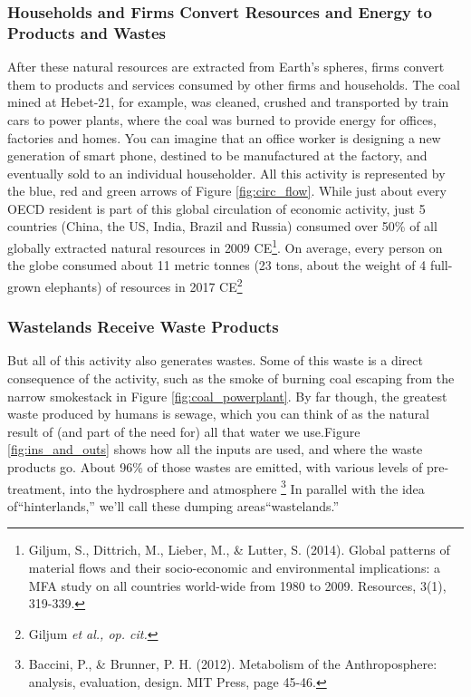 \documentclass[amstex,12pt]{book}
\begin{document}
\subsubsection{Households and Firms Convert Resources and Energy to Products and Wastes}
After these natural resources are extracted from Earth's spheres, firms convert them to products and services consumed by other firms and households. The coal mined at Hebet-21, for example, was cleaned, crushed and transported by train cars to power plants, where the coal was burned to provide energy for offices, factories and homes. You can imagine that an office worker is designing a new generation of smart phone, destined to be manufactured at the factory, and eventually sold to an individual householder. All this activity is represented by the blue, red and green arrows of Figure \ref{fig:circ_flow}. While just about every OECD resident is part of this global circulation of economic activity, just 5 countries (China, the US, India, Brazil and Russia) consumed over 50\% of all globally extracted natural resources in 2009 CE\footnote{Giljum, S., Dittrich, M., Lieber, M., \& Lutter, S. (2014). Global patterns of material flows and their socio-economic and environmental implications: a MFA study on all countries world-wide from 1980 to 2009. Resources, 3(1), 319-339.}. On average, every person on the globe consumed about 11 metric tonnes (23 tons, about the weight of 4 full-grown elephants) of resources in 2017 CE\footnote{Giljum \textit{et al., op. cit.}}\\

\subsubsection{Wastelands Receive Waste Products}
But all of this activity also generates wastes. Some of this waste is a direct consequence of the activity, such as the smoke of burning coal escaping from the narrow smokestack in Figure \ref{fig:coal_powerplant}. By far though, the greatest waste produced by humans is sewage, which you can think of as the natural result of (and part of the need for) all that water we use.Figure \ref{fig:ins_and_outs} shows how all the inputs are used, and where the waste products go. About 96\% of those wastes are emitted, with various levels of pre-treatment, into the hydrosphere and atmosphere \footnote{Baccini, P., \& Brunner, P. H. (2012). Metabolism of the Anthroposphere: analysis, evaluation, design. MIT Press, page 45-46.} In parallel with the idea of``hinterlands,'' we'll call these dumping areas``wastelands.'' \\
\end{document}
